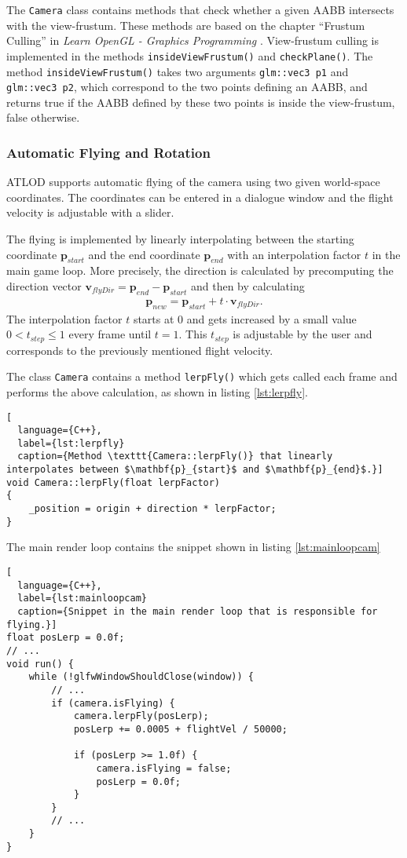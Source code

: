 The \texttt{Camera} class contains methods that check whether a given AABB intersects with the view-frustum.
These methods are based on the chapter ``Frustum Culling'' in \textit{Learn OpenGL - Graphics Programming} \cite{learnopengl}.
View-frustum culling is implemented in the methods \texttt{insideViewFrustum()} and \texttt{checkPlane()}.
The method \texttt{insideViewFrustum()} takes two arguments \texttt{glm::vec3 p1} and \texttt{glm::vec3 p2},
which correspond to the two points defining an AABB, and returns true if the AABB defined by these 
two points is inside the view-frustum, false otherwise.

\subsubsection{Automatic Flying and Rotation}
ATLOD supports automatic flying of the camera using two given world-space coordinates.
The coordinates can be entered in a dialogue window and the flight velocity is adjustable with a slider.

The flying is implemented by linearly interpolating between the starting coordinate $\mathbf{p}_{start}$ 
and the end coordinate $\mathbf{p}_{end}$ with an interpolation factor $t$ in the main game loop.
More precisely, the direction is calculated by precomputing the direction vector $\mathbf{v}_{flyDir} = \mathbf{p}_{end} - \mathbf{p}_{start}$ and then by calculating
\begin{align*}
  \mathbf{p}_{new} = \mathbf{p}_{start} + t \cdot \mathbf{v}_{flyDir}.
\end{align*}
The interpolation factor $t$ starts at 0 and gets increased by a small value $0< t_{step}\leq1$ every frame until 
$t = 1$. This $t_{step}$ is adjustable by the user and corresponds to the previously mentioned flight velocity.

The class \texttt{Camera} contains a method \texttt{lerpFly()} which gets called each frame and performs the above calculation, as shown in listing \ref{lst:lerpfly}.
\begin{lstlisting}[
  language={C++},
  label={lst:lerpfly}
  caption={Method \texttt{Camera::lerpFly()} that linearly interpolates between $\mathbf{p}_{start}$ and $\mathbf{p}_{end}$.}]
void Camera::lerpFly(float lerpFactor)
{     
    _position = origin + direction * lerpFactor;
}
\end{lstlisting}

The main render loop contains the snippet shown in listing \ref{lst:mainloopcam}
\begin{lstlisting}[
  language={C++},
  label={lst:mainloopcam}
  caption={Snippet in the main render loop that is responsible for flying.}]
float posLerp = 0.0f;
// ...
void run() {
    while (!glfwWindowShouldClose(window)) {
        // ...
        if (camera.isFlying) {
            camera.lerpFly(posLerp);
            posLerp += 0.0005 + flightVel / 50000;

            if (posLerp >= 1.0f) {
                camera.isFlying = false;
                posLerp = 0.0f;
            }
        }
        // ...
    }
}
\end{lstlisting}

